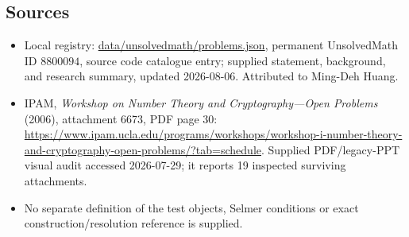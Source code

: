 \documentclass[11pt]{article}
\begin{document}
\subsection{Sources}
\begin{itemize}
\item Local registry: \url{data/unsolvedmath/problems.json}, permanent UnsolvedMath ID \(8800094\), source code catalogue entry; supplied statement, background, and research summary, updated 2026-08-06. Attributed to Ming-Deh Huang.
\item IPAM, \emph{Workshop on Number Theory and Cryptography---Open Problems} (2006), attachment 6673, PDF page 30: \url{https://www.ipam.ucla.edu/programs/workshops/workshop-i-number-theory-and-cryptography-open-problems/?tab=schedule}. Supplied PDF/legacy-PPT visual audit accessed 2026-07-29; it reports 19 inspected surviving attachments.
\item No separate definition of the test objects, Selmer conditions or exact construction/resolution reference is supplied.
\end{itemize}
\end{document}
